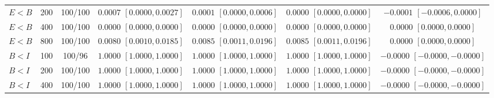 \documentclass[12pt,letterpaper]{article}
\theoremstyle{plain}
\theoremstyle{definition}
\begin{document}
\begin{table}[p]
\begin{adjustbox}{max width=\linewidth}
\begin{tabular}{lrccccc}
$E<B$ & 200 & 100/100 & \shortstack{$0.0007$\\{\scriptsize$[0.0000,0.0027]$}} & \shortstack{$0.0001$\\{\scriptsize$[0.0000,0.0006]$}} & \shortstack{$0.0000$\\{\scriptsize$[0.0000,0.0000]$}} & \shortstack{$-0.0001$\\{\scriptsize$[-0.0006,0.0000]$}}\\
$E<B$ & 400 & 100/100 & \shortstack{$0.0000$\\{\scriptsize$[0.0000,0.0000]$}} & \shortstack{$0.0000$\\{\scriptsize$[0.0000,0.0000]$}} & \shortstack{$0.0000$\\{\scriptsize$[0.0000,0.0000]$}} & \shortstack{$0.0000$\\{\scriptsize$[0.0000,0.0000]$}}\\
$E<B$ & 800 & 100/100 & \shortstack{$0.0080$\\{\scriptsize$[0.0010,0.0185]$}} & \shortstack{$0.0085$\\{\scriptsize$[0.0011,0.0196]$}} & \shortstack{$0.0085$\\{\scriptsize$[0.0011,0.0196]$}} & \shortstack{$0.0000$\\{\scriptsize$[0.0000,0.0000]$}}\\
\addlinespace
$B<I$ & 100 & 100/96 & \shortstack{$1.0000$\\{\scriptsize$[1.0000,1.0000]$}} & \shortstack{$1.0000$\\{\scriptsize$[1.0000,1.0000]$}} & \shortstack{$1.0000$\\{\scriptsize$[1.0000,1.0000]$}} & \shortstack{$-0.0000$\\{\scriptsize$[-0.0000,-0.0000]$}}\\
$B<I$ & 200 & 100/100 & \shortstack{$1.0000$\\{\scriptsize$[1.0000,1.0000]$}} & \shortstack{$1.0000$\\{\scriptsize$[1.0000,1.0000]$}} & \shortstack{$1.0000$\\{\scriptsize$[1.0000,1.0000]$}} & \shortstack{$-0.0000$\\{\scriptsize$[-0.0000,-0.0000]$}}\\
$B<I$ & 400 & 100/100 & \shortstack{$1.0000$\\{\scriptsize$[1.0000,1.0000]$}} & \shortstack{$1.0000$\\{\scriptsize$[1.0000,1.0000]$}} & \shortstack{$1.0000$\\{\scriptsize$[1.0000,1.0000]$}} & \shortstack{$-0.0000$\\{\scriptsize$[-0.0000,-0.0000]$}}\\

\end{tabular}
\end{adjustbox}
\end{table}
\end{document}
